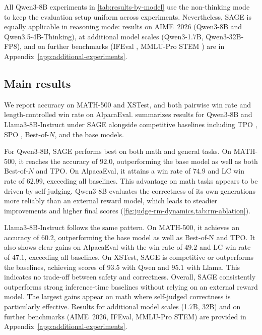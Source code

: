 \documentclass[11pt]{article}
\theoremstyle{plain}
\theoremstyle{definition}
\theoremstyle{remark}
\newcommand{\method}{SAGE}
\begin{document}
All Qwen3-8B experiments in \cref{tab:results-by-model} use the non-thinking mode to keep the evaluation setup uniform across experiments. Nevertheless, \method{} is equally applicable in reasoning mode: results on AIME~2026 \citet{dekoninck2026beyond} (Qwen3-8B and Qwen3.5-4B-Thinking), at additional model scales (Qwen3-1.7B, Qwen3-32B-FP8), and on further benchmarks (IFEval \citet{zhou2023instruction}, MMLU-Pro STEM \citet{wang2024mmlu}) are in Appendix~\ref{app:additional-experiments}.

\subsection{Main results}
\noindent We report accuracy on MATH-500 and XSTest, and both pairwise win rate and length-controlled win rate on AlpacaEval.  summarizes results for Qwen3-8B and Llama3-8B-Instruct under \method{} alongside competitive baselines including TPO \citep{litest}, SPO \citep{xiang2025self}, Best-of-\(N\), and the base models.

For Qwen3-8B, \method{} performs best on both math and general tasks. On MATH-500, it reaches the accuracy of \(92.0\), outperforming the base model as well as both Best-of-\(N\) and TPO. On AlpacaEval, it attains a win rate of \(74.9\) and LC win rate of \(62.99\), exceeding all baselines.  This advantage on math tasks appears to be driven by self-judging. Qwen3‑8B evaluates the correctness of its own generations more reliably than an external reward model, which leads to steadier improvements and higher final scores (\cref{fig:judge-rm-dynamics,tab:rm-ablation}).

Llama3‑8B‑Instruct follows the same pattern. On MATH-500, it achieves an accuracy of \(60.2\), outperforming the base model as well as Best-of-N and TPO. It also shows clear gains on AlpacaEval with the win rate of \(49.2\) and LC win rate of \(47.1\), exceeding all baselines. On XSTest, \method{} is competitive or outperforms the baselines, achieving scores of \(93.5\) with Qwen and \(95.1\) with Llama. This indicates no trade‑off between safety and correctness. Overall, \method{} consistently outperforms strong inference‑time baselines without relying on an external reward model. The largest gains appear on math where self‑judged correctness is particularly effective. Results for additional model scales (1.7B, 32B) and on further benchmarks (AIME~2026, IFEval, MMLU-Pro STEM) are provided in Appendix~\ref{app:additional-experiments}.
\end{document}
